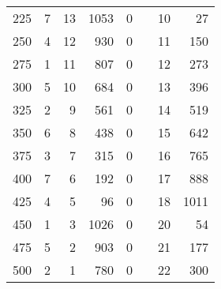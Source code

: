 \begin{tabnums}
\begin{tabular}[c]{@{} r rrr r@{}lrr @{}}
 225 & 7 & 13 & 1053 & 0&& 10 &   27 \\
 250 & 4 & 12 &  930 & 0&& 11 &  150 \\
 275 & 1 & 11 &  807 & 0&& 12 &  273 \\
 300 & 5 & 10 &  684 & 0&& 13 &  396 \\
 325 & 2 &  9 &  561 & 0&& 14 &  519 \\
 350 & 6 &  8 &  438 & 0&& 15 &  642 \\
 375 & 3 &  7 &  315 & 0&& 16 &  765 \\
 400 & 7 &  6 &  192 & 0&& 17 &  888 \\
 425 & 4 &  5 &   96 & 0&& 18 & 1011 \\
 450 & 1 &  3 & 1026 & 0&& 20 &   54 \\
 475 & 5 &  2 &  903 & 0&& 21 &  177 \\
 500 & 2 &  1 &  780 & 0&& 22 &  300 \\
 

\end{tabular}
\end{tabnums}
